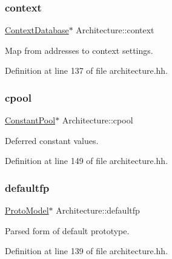 \subsubsection{\texorpdfstring{context}{context}}
{\footnotesize\ttfamily \mbox{\hyperlink{class_context_database}{Context\+Database}}$\ast$ Architecture\+::context}



Map from addresses to context settings. 



Definition at line 137 of file architecture.\+hh.

\mbox{\label{class_architecture_adeb5761c98d8af556fb59753d68dfd97}} 
\subsubsection{\texorpdfstring{cpool}{cpool}}
{\footnotesize\ttfamily \mbox{\hyperlink{class_constant_pool}{Constant\+Pool}}$\ast$ Architecture\+::cpool}



Deferred constant values. 



Definition at line 149 of file architecture.\+hh.

\mbox{\label{class_architecture_a1e0f5d45f6dcd494b15bb55f81f656b2}} 
\subsubsection{\texorpdfstring{defaultfp}{defaultfp}}
{\footnotesize\ttfamily \mbox{\hyperlink{class_proto_model}{Proto\+Model}}$\ast$ Architecture\+::defaultfp}



Parsed form of default prototype. 



Definition at line 139 of file architecture.\+hh.

\mbox{\label{class_architecture_ad0b5e0d6c22247d4ec2422c81ddec8f8}} 
